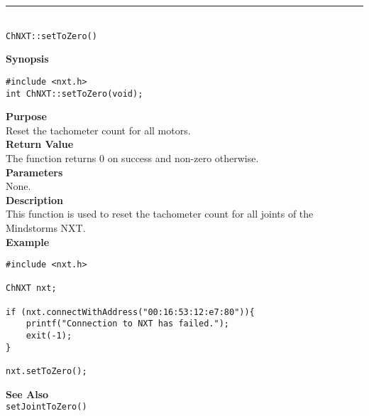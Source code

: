 \noindent
\vspace{5pt}
\rule{4.5in}{0.015in}\\
\noindent
{\LARGE \texttt{ChNXT::setToZero()} }\\


\noindent
{\bf Synopsis}
\vspace{-8pt}
\begin{verbatim}
#include <nxt.h>
int ChNXT::setToZero(void);
\end{verbatim}

\noindent
{\bf Purpose}\\
Reset the tachometer count for all motors.\\

\noindent
{\bf Return Value}\\
The function returns 0 on success and non-zero otherwise.\\

\noindent
{\bf Parameters}\\
None.\\

\noindent
{\bf Description}\\
This function is used to reset the tachometer count for 
all joints of the Mindstorms NXT.\\

\noindent
{\bf Example}
\begin{verbatim}
#include <nxt.h> 

ChNXT nxt;

if (nxt.connectWithAddress("00:16:53:12:e7:80")){
    printf("Connection to NXT has failed.");
    exit(-1);
}
    
nxt.setToZero();
\end{verbatim}

\noindent
{\bf See Also}\\
\texttt{setJointToZero()}\\
